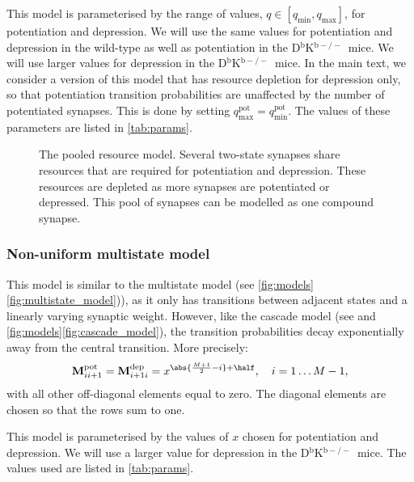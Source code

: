 \documentclass[12pt]{article}
\newcommand{\M}{\mathbf{M}}
\newcommand{\pot}{^{\text{pot}}}
\newcommand{\dep}{^{\text{dep}}}
\newcommand{\KO}{D$^\mathrm{b}$K$^{\mathrm{b}-/-}$}
\newcommand{\lmax}{_{\text{max}}}
\newcommand{\lmin}{_{\text{min}}}
\begin{document}
This model is parameterised by the range of values, $q\in[q\lmin,q\lmax]$, for potentiation and depression.
We will use the same values for potentiation and depression in the wild-type as well as potentiation in the \KO\ mice.
We will use larger values for depression in the \KO\ mice.
In the main text, we consider a version of this model that has resource depletion for depression only, so that potentiation transition probabilities are unaffected by the number of potentiated synapses.
This is done by setting $q\pot\lmax=q\pot\lmin$.
The values of these parameters are listed in \autoref{tab:params}.


\begin{figure}
 \begin{center}
 \end{center}
  \caption[The pooled resource model]{The pooled resource model.
  Several two-state synapses share resources that are required for potentiation and depression.
  These resources are depleted as more synapses are potentiated or depressed.
  This pool of synapses can be modelled as one compound synapse.} \label{fig:pooled_model}
\end{figure}


\subsubsection{Non-uniform multistate model}\label{sec:nonunimodel}

This model is similar to the multistate model (see \autoref{fig:models}\ref{fig:multistate_model})), as it only has transitions between adjacent states and a linearly varying synaptic weight.
However, like the cascade model (see \cite{Fusi2005cascade} and \autoref{fig:models}\ref{fig:cascade_model}), the transition probabilities decay exponentially away from the central transition.
More precisely:
%
\begin{equation}\label{eq:nonunidef}
    \M\pot_{ii+1} = \M\dep_{i+1i} =  x^{\abs{\frac{M+1}{2}-i}+\half},
      \quad i = 1 \ldots M-1,
\end{equation}
%
with all other off-diagonal elements equal to zero.
The diagonal elements are chosen so that the rows sum to one.

This model is parameterised by the values of $x$ chosen for potentiation and depression.
We will use a larger value for depression in the \KO\ mice.
The values used are listed in \autoref{tab:params}.
\end{document}
